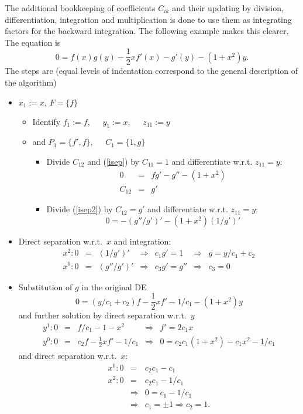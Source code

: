 The additional bookkeeping of coefficients $C_{ik}$ and their updating by
division, differentiation, integration and multiplication is done to use
them as integrating factors for the backward integration.
The following example makes this clearer. The equation is
\begin{equation}
0 = f(x) g(y) - \frac{1}{2}xf'(x) - g'(y) - (1+x^2)y. \label{isep}
\end{equation}
The steps are (equal levels of indentation correspond to the general
description of the algorithm)
\begin{itemize}
 \item $x_1:=x, \, F=\{f\}$
 \begin{itemize}
  \item Identify $f_1:=f, \; \; \; \; \; y_1:=x, \; \; \; \; \; z_{11}:=y$ 
  \item and $P_1=\{f',f\}, \; \; \; \; \; C_1=\{1,g\}$
  \begin{itemize}
   \item Divide $C_{12}$ and 
         (\ref{isep}) by $C_{11}=1$ and differentiate w.r.t. $z_{11}=y:$
         \begin{eqnarray}
         0 & = & fg' - g'' - (1+x^2)   \label{isep2}  \\
         C_{12} & = & g'    \nonumber
         \end{eqnarray}
 \item Divide (\ref{isep2}) by $C_{12}=g'$ and differentiate w.r.t. $z_{11}=y:$
\[ 0 = - (g''/g')' - (1+x^2)(1/g')' \]

  \end{itemize}
 \end{itemize}
 \item Direct separation w.r.t.\ $x$ and integration:
 \[\begin{array}{rclclcl}
  x^2: 0 & = & (1/g')' & \Rightarrow & c_1g' =  1 & \Rightarrow &
        g = y/c_1 + c_2 \\
  x^0: 0 & = & (g''/g')' & \Rightarrow & c_3g' = g'' & \Rightarrow &
        c_3 = 0
 \end{array} \]
 \item Substitution of $g$ in the original DE
       \[0 = (y/c_1+c_2)f - \frac{1}{2}xf' - 1/c_1 - (1+x^2)y \]
       and further solution by direct separation w.r.t.\ $y$
 \[\begin{array}{rclcl}
  y^1: 0 & = & f/c_1 - 1 - x^2               & \Rightarrow & f'  =  2c_1x \\
  y^0: 0 & = & c_2f - \frac{1}{2}xf' - 1/c_1 & \Rightarrow & 0   =  
       c_2c_1(1+x^2) - c_1x^2 - 1/c_1
 \end{array}\]
       and direct separation w.r.t.\ $x$:
 \begin{eqnarray*}
 x^0:  0 & = & c_2c_1 - c_1    \\
 x^2:  0 & = & c_2c_1 - 1/c_1   \\
    & \Rightarrow &  0 = c_1 - 1/c_1   \\
    & \Rightarrow & c_1 = \pm 1 \Rightarrow c_2 = 1.
 \end{eqnarray*}
\end{itemize}
